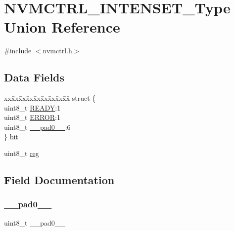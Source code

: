 \hypertarget{union_n_v_m_c_t_r_l___i_n_t_e_n_s_e_t___type}{}\section{N\+V\+M\+C\+T\+R\+L\+\_\+\+I\+N\+T\+E\+N\+S\+E\+T\+\_\+\+Type Union Reference}
\label{union_n_v_m_c_t_r_l___i_n_t_e_n_s_e_t___type}


{\ttfamily \#include $<$nvmctrl.\+h$>$}

\subsection*{Data Fields}
\begin{DoxyCompactItemize}
\item 
\begin{tabbing}
xx\=xx\=xx\=xx\=xx\=xx\=xx\=xx\=xx\=\kill
struct \{\\
\>uint8\_t \mbox{\hyperlink{union_n_v_m_c_t_r_l___i_n_t_e_n_s_e_t___type_a87c971ad119330af2fdb7bca4011addb}{READY}}:1\\
\>uint8\_t \mbox{\hyperlink{union_n_v_m_c_t_r_l___i_n_t_e_n_s_e_t___type_a4be51829c8720b7d159b77c39924afaa}{ERROR}}:1\\
\>uint8\_t \mbox{\hyperlink{union_n_v_m_c_t_r_l___i_n_t_e_n_s_e_t___type_a8b4eebe79ded0459acec2f4950102ba3}{\_\_pad0\_\_}}:6\\
\} \mbox{\hyperlink{union_n_v_m_c_t_r_l___i_n_t_e_n_s_e_t___type_a580e00f70c948294735e200816e3588f}{bit}}\\

\end{tabbing}\item 
uint8\+\_\+t \mbox{\hyperlink{union_n_v_m_c_t_r_l___i_n_t_e_n_s_e_t___type_a9428adc9af4653a2050e2536b55dec8d}{reg}}
\end{DoxyCompactItemize}


\subsection{Field Documentation}
\mbox{\label{union_n_v_m_c_t_r_l___i_n_t_e_n_s_e_t___type_a8b4eebe79ded0459acec2f4950102ba3}} 
\subsubsection{\texorpdfstring{\_\_pad0\_\_}{\_\_pad0\_\_}}
{\footnotesize\ttfamily uint8\+\_\+t \+\_\+\+\_\+pad0\+\_\+\+\_\+}

